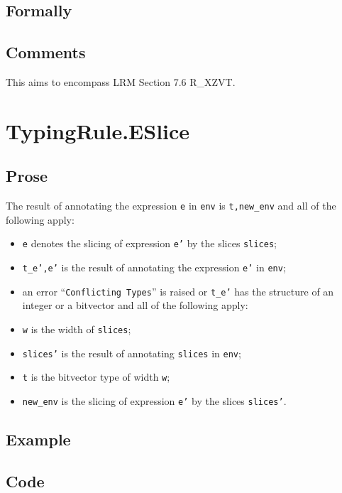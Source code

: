 \documentclass{book}
\begin{document}
\begin{emptyformal}
    \subsection{Formally}
\end{emptyformal}

\subsection{Comments}
  This aims to encompass LRM Section 7.6 R\_XZVT.

\section{TypingRule.ESlice \label{sec:TypingRule.ESlice}}

  \subsection{Prose}
  The result of annotating the expression \texttt{e} in \texttt{env} is
\texttt{t,new\_env} and all of the following apply:
  \begin{itemize}
  \item \texttt{e} denotes the slicing of expression \texttt{e'} by the slices \texttt{slices};
  \item \texttt{t\_e',e'} is the result of annotating the expression \texttt{e'} in \texttt{env};
  \item an error ``\texttt{Conflicting Types}'' is raised or \texttt{t\_e'} has the structure of an integer or a bitvector and all of the following apply:
  \item \texttt{w} is the width of \texttt{slices};
  \item \texttt{slices'} is the result of annotating \texttt{slices} in \texttt{env};
  \item \texttt{t} is the bitvector type of width \texttt{w};
  \item \texttt{new\_env} is the slicing of expression \texttt{e'} by the slices \texttt{slices'}.
  \end{itemize}

  \subsection{Example}

  \subsection{Code}
\end{document}
